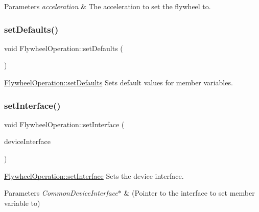 \begin{DoxyParams}{Parameters}
{\em acceleration} & The acceleration to set the flywheel to. \\
\hline
\end{DoxyParams}
\hypertarget{class_flywheel_operation_a23b72640fdedd6d89575ea9a4ef3c69a}{}\label{class_flywheel_operation_a23b72640fdedd6d89575ea9a4ef3c69a} 
\subsubsection{\texorpdfstring{set\+Defaults()}{setDefaults()}}
{\footnotesize\ttfamily void Flywheel\+Operation\+::set\+Defaults (\begin{DoxyParamCaption}{ }\end{DoxyParamCaption})}



\hyperlink{class_flywheel_operation_a23b72640fdedd6d89575ea9a4ef3c69a}{Flywheel\+Operation\+::set\+Defaults} Sets default values for member variables. 

\hypertarget{class_flywheel_operation_ab655d2757d24dbb605a8eb0c16bc0fe8}{}\label{class_flywheel_operation_ab655d2757d24dbb605a8eb0c16bc0fe8} 
\subsubsection{\texorpdfstring{set\+Interface()}{setInterface()}}
{\footnotesize\ttfamily void Flywheel\+Operation\+::set\+Interface (\begin{DoxyParamCaption}\item[{\hyperlink{class_common_device_interface}{Common\+Device\+Interface} $\ast$}]{device\+Interface }\end{DoxyParamCaption})}



\hyperlink{class_flywheel_operation_ab655d2757d24dbb605a8eb0c16bc0fe8}{Flywheel\+Operation\+::set\+Interface} Sets the device interface. 


\begin{DoxyParams}{Parameters}
{\em Common\+Device\+Interface$\ast$} & (Pointer to the interface to set member variable to) \\
\hline
\end{DoxyParams}
\hypertarget{class_flywheel_operation_a4f14dfe672793f37e21f90ecab499378}{}\label{class_flywheel_operation_a4f14dfe672793f37e21f90ecab499378} 
